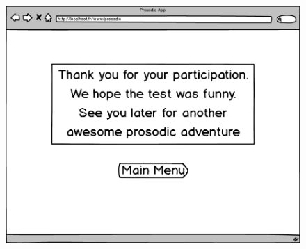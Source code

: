 \documentclass[a4paper,twoside,10pt]{report}
\begin{document}
 \begin{figure}[ht]
  \includegraphics[width=\textwidth]{T-4.png}
 \end{figure}






\nocite{*} %




\appendix

\end{document}

